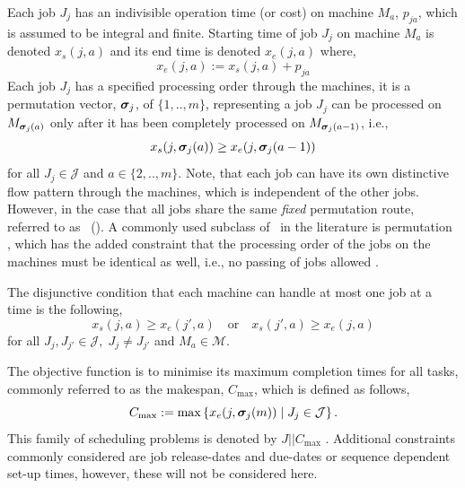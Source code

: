 \documentclass[smallextended]{svjour3}
\begin{document}
Each job $J_j$ has an indivisible operation time (or cost) on machine $M_a$, 
$p_{ja}$, which is assumed to be integral and finite. 
Starting time of job $J_j$ on machine $M_a$ is denoted $x_s(j,a)$ and its 
end time is denoted $x_e(j,a)$ where, 
\begin{equation}  x_e(j,a):=x_s(j,a)+p_{ja} \end{equation} 
Each job $J_j$ has a specified processing order through the machines, it is a 
permutation vector, $\bm \sigma_j$, of $\{1,..,m\}$, representing a job $J_j$ can 
be processed on $M_{\bm \sigma_j(a)}$ only after it has been completely processed 
on $M_{\bm \sigma_j(a-1)}$, i.e.,
\begin{equation}\label{eq:permutation}
x_s(j,\bm \sigma_j(a)) \geq x_e(j,\bm \sigma_j(a-1)) 
\end{equation}
for all $J_j\in\mathcal{J}$ and $a\in\{2,..,m\}$. 
Note, that each job can have its own distinctive flow pattern through the 
machines, which is independent of the other jobs. 
However, in the case that all jobs share the same \emph{fixed} permutation 
route, referred to as \fsp~(\FSP). 
A commonly used subclass of \FSP\ in the literature is permutation \fsp, which 
has the added constraint that the processing order of the jobs on the machines 
must be identical as well, i.e., no passing of jobs allowed \cite{Stafford88}.

The disjunctive condition that each machine can handle at most one job at a 
time is the following,
\begin{equation}\label{eq:oneJobPerMac}
x_s(j,a) \geq x_e(j',a) \quad\textrm{or}\quad x_s(j',a) \geq x_e(j,a)  
\end{equation}
for all $J_j,J_{j'}\in\mathcal{J},\; J_j\neq J_{j'}$ and $M_a\in\mathcal{M}$. 

The objective function is to minimise its maximum completion times for all 
tasks, commonly referred to as the makespan, $C_{\max}$, which is defined as 
follows,
\begin{equation}
C_{\max} := 
\max\left\{x_e(j,\bm \sigma_j(m))\;\middle|\;J_j\in\mathcal{J}\right\}.\label{eq:makespan}
\end{equation} 
This family of scheduling problems is denoted by $J||C_{\max}$ 
\cite{Pinedo08}.
Additional constraints commonly considered are job release-dates and due-dates 
or sequence dependent set-up times, however, these will not be considered here. 
\end{document}
